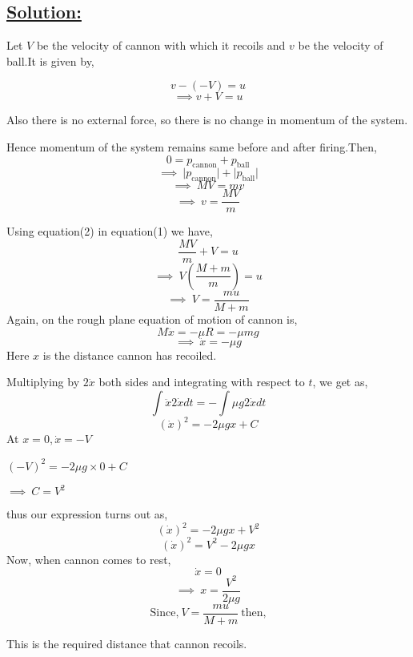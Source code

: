 \documentclass[12pt,a4paper]{article}
\begin{document}
    \subsection*{\underline{Solution:}}

    Let $V$ be the velocity of cannon with which it recoils and $v$ be the velocity of ball.It is given by,

    \[v-(-V) = u\]
    \begin{equation*}
        \implies v + V = u \tag*{(1)}
    \end{equation*}

    Also there is no external force, so there is no change in momentum of the system. 

    Hence momentum of the system remains same before and after firing.Then,
    \[0 = p_{\mbox{cannon}} + p_{\mbox{ball}}\]
    \[\implies\ \bigg|p_{\mbox{cannon}}\bigg| + \bigg|p_{\mbox{ball}}\bigg|\]
    \[\implies\ MV = mv \]
    \begin{equation*}
        \implies\ v = \frac{MV}{m} \tag*{(2)}
    \end{equation*}
    \begin{center}
        Using equation(2) in equation(1) we have,
        \[\frac{MV}{m} + V = u\]
        \[\implies\ V\left(\frac{M+m}{m} \right) = u\]
        \[\implies\ V = \frac{mu}{M + m}\]
        Again, on the rough plane equation of motion of cannon is,
        \[M\ddot{x} = -\mu R = -\mu mg\]
        \[\implies\ \ddot{x} = -\mu g\]
        Here $x$ is the distance cannon has recoiled.


        Multiplying by $2\dot{x}$ both sides and integrating with respect to $t$, we get as,
        \[\int \ddot{x} 2\dot{x}dt = -\int \mu g 2\dot{x}dt\]
        \[(\dot{x})^2 = -2\mu gx + C\]
        At $x = 0,  \dot{x} = -V$


        $(-V)^2 = -2\mu g\times 0 + C$


        $\implies\ C = V^2$

        thus our expression turns out as,
        \[(\dot{x})^2 = -2\mu gx + V^2\]
        \[(\dot{x})^2 = V^2 - 2\mu gx\]
        Now, when cannon comes to rest,
        \[\dot{x} = 0\]
        \[\implies\ x = \frac{V^2}{2\mu g}\]
        \[\mbox{Since,}\ V = \frac{mu}{M+m}\ \mbox{then,}\]

        \vspace*{0.2cm}
        This is the required distance that cannon recoils.
    \end{center}
    
\end{document}
